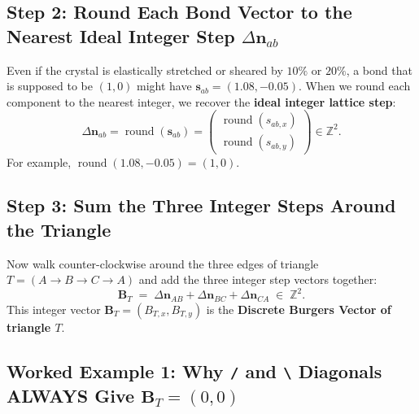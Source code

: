 \documentclass[11pt,a4paper]{article}
\newcommand{\Z}{\mathbb{Z}}
\newcommand{\code}[1]{\texttt{#1}}
\begin{document}
\subsection{Step 2: Round Each Bond Vector to the Nearest Ideal Integer Step \texorpdfstring{$\Delta\bm{n}_{ab}$}{Delta n\_ab}}
Even if the crystal is elastically stretched or sheared by $10\%$ or $20\%$, a bond that is supposed
to be $(1, 0)$ might have $\bm{s}_{ab} = (1.08, -0.05)$. When we round each component to the nearest
integer, we recover the \textbf{ideal integer lattice step}:
\begin{equation}
  \Delta\bm{n}_{ab} = \operatorname{round}(\bm{s}_{ab}) =
  \begin{pmatrix} \operatorname{round}(s_{ab,x}) \\[2pt] \operatorname{round}(s_{ab,y}) \end{pmatrix} \in \Z^2.
  \label{eq:round_step}
\end{equation}
For example, $\operatorname{round}(1.08, -0.05) = (1, 0)$.

\subsection{Step 3: Sum the Three Integer Steps Around the Triangle}
Now walk counter-clockwise around the three edges of triangle $T = (A \to B \to C \to A)$ and add
the three integer step vectors together:
\begin{equation}
  \boxed{\;\bm{B}_T \;=\; \Delta\bm{n}_{AB} + \Delta\bm{n}_{BC} + \Delta\bm{n}_{CA} \;\in\; \Z^2.\;}
  \label{eq:BT_def}
\end{equation}
This integer vector $\bm{B}_T = (B_{T,x}, B_{T,y})$ is the \textbf{Discrete Burgers Vector of triangle $T$}.

\subsection{Worked Example 1: Why \code{/} and \code{\textbackslash} Diagonals ALWAYS Give \texorpdfstring{$\bm{B}_T = (0,0)$}{B\_T = (0,0)}}
\end{document}
